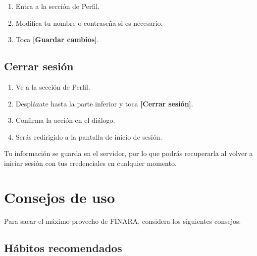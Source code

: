 \documentclass[a4paper,12pt]{report}
\newcommand{\boton}[1]{\textbf{\textcolor{azulipn}{[#1]}}}
\begin{document}
\begin{enumerate}
  \item Entra a la sección de Perfil.
  \item Modifica tu nombre o contraseña si es necesario.
  \item Toca \boton{Guardar cambios}.
\end{enumerate}

\section{Cerrar sesión}

\begin{enumerate}
  \item Ve a la sección de Perfil.
  \item Desplázate hasta la parte inferior y toca
        \boton{Cerrar sesión}.
  \item Confirma la acción en el diálogo.
  \item Serás redirigido a la pantalla de inicio de sesión.
\end{enumerate}

Tu información se guarda en el servidor, por lo que podrás recuperarla
al volver a iniciar sesión con tus credenciales en cualquier momento.


\chapter{Consejos de uso}

Para sacar el máximo provecho de FINARA, considera los siguientes
consejos:

\section{Hábitos recomendados}
\end{document}
